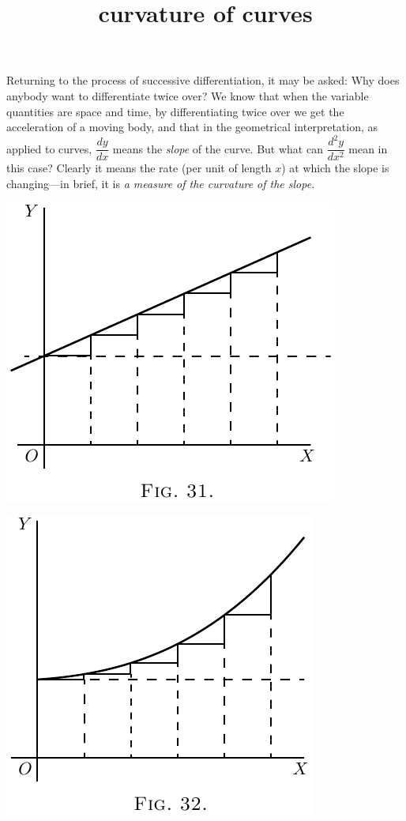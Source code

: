 \documentclass{ximera}
\title{curvature of curves}
\begin{document}
\begin{abstract}
\end{abstract}
\maketitle

Returning to the process of successive differentiation,
it may be asked: Why does anybody want to
differentiate twice over? We know that when the
variable quantities are space and time, by differentiating
twice over we get the acceleration of a
moving body, and that in the geometrical interpretation,
as applied to curves, $\dfrac{dy}{dx}$ means the \textit{slope} of the
curve. But what can $\dfrac{d^2 y}{dx^2}$ mean in this case? Clearly
it means the rate (per unit of length $x$) at which the
slope is changing---in brief, it is \textit{a measure of the
curvature of the slope}.

\begin{image}
\label{Figure31}
\includegraphics{124a.png}
\end{image}
\begin{image}
\label{Figure32}
\includegraphics{124b.png}
\end{image}
\end{document}
